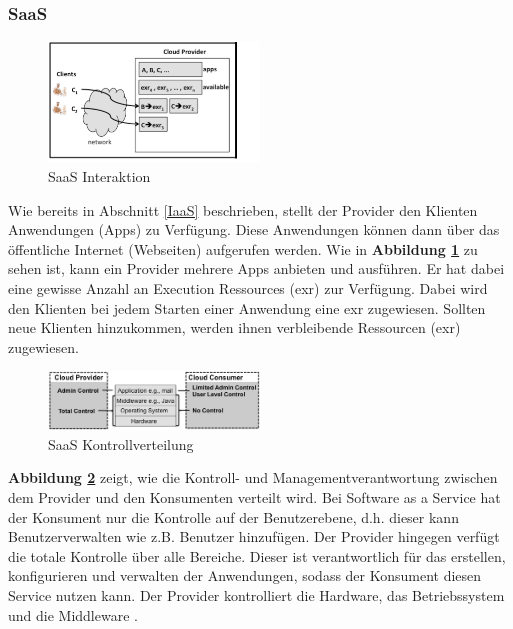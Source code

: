 \subsubsection{SaaS}\label{SaaS Architektur}

\begin{figure}[h]
    \centering
	\includegraphics[width=0.5\textwidth]{Images/SaaSInteraction}
	\caption{SaaS Interaktion \cite{Badger}}
	\label{SaaSInteraction}
\end{figure}
Wie bereits in Abschnitt \ref{IaaS} beschrieben, stellt der Provider den Klienten Anwendungen (\glqq Apps\grqq{}{}) zu Verfügung.
Diese Anwendungen können dann über das öffentliche Internet (Webseiten) aufgerufen werden.
Wie in \textbf{Abbildung \ref{SaaSInteraction}} zu sehen ist, kann ein Provider mehrere Apps anbieten und ausführen.
Er hat dabei eine gewisse Anzahl an \glqq Execution Ressources\grqq{}{} (exr) zur Verfügung. 
Dabei wird den Klienten bei jedem Starten einer Anwendung eine exr zugewiesen. Sollten neue Klienten hinzukommen, werden ihnen verbleibende Ressourcen (exr) zugewiesen. 

\begin{figure}[h]
    \centering
	\includegraphics[width=0.5\textwidth]{Images/SaaSControl}
	\caption{SaaS Kontrollverteilung \cite{Badger}}
	\label{SaaSControl}
\end{figure}
\textbf{Abbildung \ref{SaaSControl}} zeigt, wie die Kontroll- und Managementverantwortung zwischen dem Provider und den Konsumenten verteilt wird.
Bei Software as a Service hat der Konsument nur die Kontrolle auf der Benutzerebene, d.h. dieser kann Benutzerverwalten wie z.B. Benutzer hinzufügen.
Der Provider hingegen verfügt die totale Kontrolle über alle Bereiche. Dieser ist verantwortlich für das erstellen, konfigurieren und verwalten der Anwendungen, 
sodass der Konsument diesen Service nutzen kann.
Der Provider kontrolliert die Hardware, das Betriebssystem und die Middleware \cite{Badger}.

